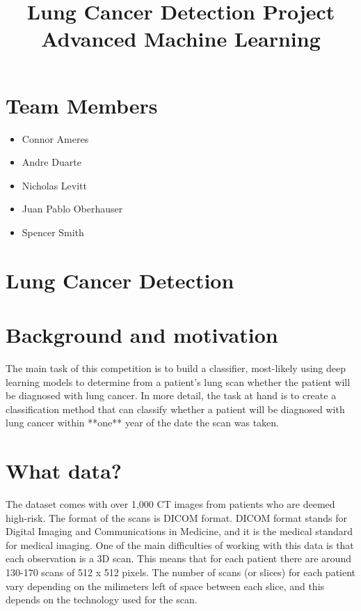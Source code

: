 \documentclass[11pt]{article}
\title{ Lung Cancer Detection Project \\ Advanced Machine Learning}
\author{}
\date{}
\begin{document}
\maketitle

\section{Team Members}

\begin{itemize}
\item Connor Ameres
\item Andre Duarte
\item Nicholas Levitt
\item Juan Pablo Oberhauser
\item Spencer Smith
\end{itemize}


\section{Lung Cancer Detection}

\section{Background and motivation}

The main task of this competition is to build a classifier, most-likely using deep learning models to determine from a patient's lung scan whether the patient will be diagnosed with lung cancer. In more detail, the task at hand is to create a classification method that can classify whether a patient will be diagnosed with lung cancer within **one** year of the date the scan was taken. 


\section{What data?}

The dataset comes with over 1,000 CT images from patients who are deemed high-risk. The format of the scans is DICOM format. DICOM format stands for Digital Imaging and Communications in Medicine, and it is the medical standard for medical imaging. One of the main difficulties of working with this data is that each observation is a 3D scan. This means that for each patient there are around 130-170 scans of 512 x 512 pixels. The number of scans (or slices) for each patient vary depending on the milimeters left of space between each slice, and this depends on the technology used for the scan. 
\end{document}
